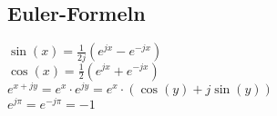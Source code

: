 \subsection{Euler-Formeln} 

	$\sin(x) = \frac{1}{2j} \left(e^{jx} - e^{-jx}\right)$ \\
	$\cos(x) = \frac{1}{2} \left(e^{jx} + e^{-jx}\right)$ \\
	$e^{x+jy} = e^x \cdot e^{jy} = e^x \cdot \left(\cos(y) + j\sin(y)\right)$ \\
	$e^{j\pi} = e^{-j\pi} = -1$ \\